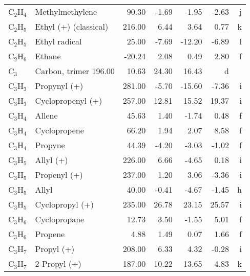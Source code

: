 \begin{table}
\begin{center}
\begin{tabular}{llrrrrr}
 C$_2$H$_4$        & Methylmethylene                &    90.30    &    -1.69  &    -1.95  &    -2.63  &      j\\
 C$_2$H$_5$        & Ethyl (+)  (classical)         &   216.00    &     6.44  &     3.64  &     0.77  &      k\\
 C$_2$H$_5$        & Ethyl radical                  &    25.00    &    -7.69  &   -12.20  &    -6.89  &      l\\
 C$_2$H$_6$        & Ethane                         &   -20.24    &     2.08  &     0.49  &     2.80  &      f\\
 C$_3$          & Carbon, trimer                     196.00    &    10.63  &    24.30  &    16.43  &      d\\
 C$_3$H$_3$        & Propynyl (+)                   &   281.00    &    -5.70  &   -15.60  &    -7.36  &      i\\
 C$_3$H$_3$        & Cyclopropenyl (+)              &   257.00    &    12.81  &    15.52  &    19.37  &      i\\
 C$_3$H$_4$        & Allene                         &    45.63    &     1.40  &    -1.74  &     0.48  &      f\\
 C$_3$H$_4$        & Cyclopropene                   &    66.20    &     1.94  &     2.07  &     8.58  &      f\\
 C$_3$H$_4$        & Propyne                        &    44.39    &    -4.20  &    -3.03  &    -1.02  &      f\\
 C$_3$H$_5$        & Allyl (+)                      &   226.00    &     6.66  &    -4.65  &     0.18  &      i\\
 C$_3$H$_5$        & Propenyl (+)                   &   237.00    &     1.20  &     3.06  &    -3.36  &      i\\
 C$_3$H$_5$        & Allyl                          &    40.00    &    -0.41  &    -4.67  &    -1.45  &      h\\
 C$_3$H$_5$        & Cyclopropyl (+)                &   235.00    &    26.78  &    23.15  &    25.57  &      i\\
 C$_3$H$_6$        & Cyclopropane                   &    12.73    &     3.50  &    -1.55  &     5.01  &      f\\
 C$_3$H$_6$        & Propene                        &     4.88    &     1.49  &     0.07  &     1.66  &      f\\
 C$_3$H$_7$        & Propyl (+)                     &   208.00    &     6.33  &     4.32  &    -0.28  &      i\\
 C$_3$H$_7$        & 2-Propyl (+)                   &   187.00    &    10.22  &    13.65  &     4.83  &      k\\

\end{tabular}
\end{center}
\end{table}
